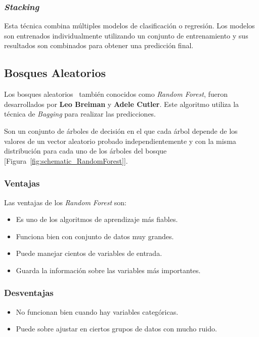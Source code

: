 \subsubsection{\textit{Stacking}}
Esta técnica combina múltiples modelos de clasificación o regresión. Los modelos son entrenados individualmente utilizando un conjunto de entrenamiento y sus resultados son combinados para obtener una predicción final.

\subsection{Bosques Aleatorios}
\label{sec:random_forest}
Los bosques aleatorios~\cite{Breiman2001} también conocidos como \textit{Random Forest}, fueron desarrollados por \textbf{Leo Breiman} y \textbf{Adele Cutler}. Este algoritmo utiliza la técnica de \textit{Bagging} para realizar las predicciones.

Son un conjunto de árboles de decisión en el que cada árbol depende de los valores de un vector aleatorio probado independientemente y con la misma distribución para cada uno de los árboles del bosque [Figura~\ref{fig:schematic_RandomForest}].




\subsubsection{Ventajas}

Las ventajas de los \textit{Random Forest} son:

\begin{itemize}
    \item Es uno de los algoritmos de aprendizaje más fiables.
    \item Funciona bien con conjunto de datos muy grandes.
    \item Puede manejar cientos de variables de entrada.
    \item Guarda la información sobre las variables más importantes.
\end{itemize}

\subsubsection{Desventajas}

\begin{itemize}
    \item No funcionan bien cuando hay variables categóricas.
    \item Puede sobre ajustar en ciertos grupos de datos con mucho ruido.
\end{itemize}



